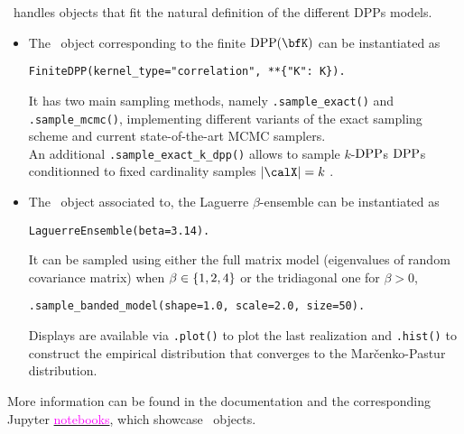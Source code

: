\documentclass[twoside,11pt]{article}
\begin{document}
  \lstset{language=mypython}

  \DPPy\ handles objects that fit the natural definition of the different DPPs models.
  \begin{itemize}
      \item The \DPPy\ object corresponding to the finite $\DPP(\bfK)$ can be instantiated as
      \begin{lstlisting}[aboveskip=5pt,
                      belowskip=-1pt,
                      xleftmargin=.1\textwidth,
                      xrightmargin=.2\textwidth]
        FiniteDPP(kernel_type="correlation", **{"K": K}).
      \end{lstlisting}
    It has two main sampling methods, namely
    \lstinline{.sample_exact()} and
    \lstinline{.sample_mcmc()},
    implementing different variants of the exact sampling scheme and current state-of-the-art MCMC samplers.\\
    An additional
    \lstinline{.sample_exact_k_dpp()}
    allows to sample $k$-$\operatorname{DPP}$s \ie $\operatorname{DPP}$s conditionned to fixed cardinality samples $|\calX|=k$ \citep[Section 5]{KuTa12}.

        \item The \DPPy\ object associated to, \eg the Laguerre $\beta$-ensemble can be instantiated as
    \begin{lstlisting}[aboveskip=5pt,
                      belowskip=-1pt,
                      xleftmargin=.2\textwidth,
                      xrightmargin=.2\textwidth]
      LaguerreEnsemble(beta=3.14).
    \end{lstlisting}
    It can be sampled using either the full matrix model (eigenvalues of random covariance matrix) when $\beta\in\left\{ 1,2,4 \right\}$ or the tridiagonal one for $\beta > 0$,
      \begin{lstlisting}[aboveskip=5pt,
                      belowskip=-1pt,
                      xleftmargin=.1\textwidth,
                      xrightmargin=.2\textwidth]
      .sample_banded_model(shape=1.0, scale=2.0, size=50).
      \end{lstlisting}
    Displays are available via
    \lstinline{.plot()} to plot the last realization and
    \lstinline{.hist()} to construct the empirical distribution that converges to the Mar\v{c}enko-Pastur distribution.
  \end{itemize}
  More information can be found in the documentation and the corresponding Jupyter \href{https://github.com/guilgautier/DPPy/tree/master/notebooks}{\textcolor{magenta}{notebooks}}, which showcase \DPPy\ objects.
\end{document}
